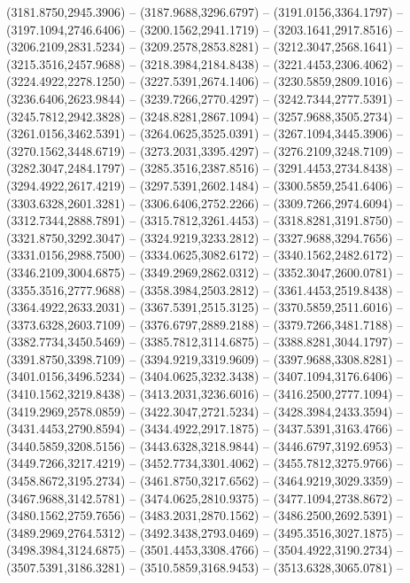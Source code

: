 \begin{scope}[y=0.80pt, x=0.80pt, yscale=-1.000000, xscale=1.000000, inner sep=0pt, outer sep=0pt]
    (3181.8750,2945.3906) -- (3187.9688,3296.6797) -- (3191.0156,3364.1797) --
    (3197.1094,2746.6406) -- (3200.1562,2941.1719) -- (3203.1641,2917.8516) --
    (3206.2109,2831.5234) -- (3209.2578,2853.8281) -- (3212.3047,2568.1641) --
    (3215.3516,2457.9688) -- (3218.3984,2184.8438) -- (3221.4453,2306.4062) --
    (3224.4922,2278.1250) -- (3227.5391,2674.1406) -- (3230.5859,2809.1016) --
    (3236.6406,2623.9844) -- (3239.7266,2770.4297) -- (3242.7344,2777.5391) --
    (3245.7812,2942.3828) -- (3248.8281,2867.1094) -- (3257.9688,3505.2734) --
    (3261.0156,3462.5391) -- (3264.0625,3525.0391) -- (3267.1094,3445.3906) --
    (3270.1562,3448.6719) -- (3273.2031,3395.4297) -- (3276.2109,3248.7109) --
    (3282.3047,2484.1797) -- (3285.3516,2387.8516) -- (3291.4453,2734.8438) --
    (3294.4922,2617.4219) -- (3297.5391,2602.1484) -- (3300.5859,2541.6406) --
    (3303.6328,2601.3281) -- (3306.6406,2752.2266) -- (3309.7266,2974.6094) --
    (3312.7344,2888.7891) -- (3315.7812,3261.4453) -- (3318.8281,3191.8750) --
    (3321.8750,3292.3047) -- (3324.9219,3233.2812) -- (3327.9688,3294.7656) --
    (3331.0156,2988.7500) -- (3334.0625,3082.6172) -- (3340.1562,2482.6172) --
    (3346.2109,3004.6875) -- (3349.2969,2862.0312) -- (3352.3047,2600.0781) --
    (3355.3516,2777.9688) -- (3358.3984,2503.2812) -- (3361.4453,2519.8438) --
    (3364.4922,2633.2031) -- (3367.5391,2515.3125) -- (3370.5859,2511.6016) --
    (3373.6328,2603.7109) -- (3376.6797,2889.2188) -- (3379.7266,3481.7188) --
    (3382.7734,3450.5469) -- (3385.7812,3114.6875) -- (3388.8281,3044.1797) --
    (3391.8750,3398.7109) -- (3394.9219,3319.9609) -- (3397.9688,3308.8281) --
    (3401.0156,3496.5234) -- (3404.0625,3232.3438) -- (3407.1094,3176.6406) --
    (3410.1562,3219.8438) -- (3413.2031,3236.6016) -- (3416.2500,2777.1094) --
    (3419.2969,2578.0859) -- (3422.3047,2721.5234) -- (3428.3984,2433.3594) --
    (3431.4453,2790.8594) -- (3434.4922,2917.1875) -- (3437.5391,3163.4766) --
    (3440.5859,3208.5156) -- (3443.6328,3218.9844) -- (3446.6797,3192.6953) --
    (3449.7266,3217.4219) -- (3452.7734,3301.4062) -- (3455.7812,3275.9766) --
    (3458.8672,3195.2734) -- (3461.8750,3217.6562) -- (3464.9219,3029.3359) --
    (3467.9688,3142.5781) -- (3474.0625,2810.9375) -- (3477.1094,2738.8672) --
    (3480.1562,2759.7656) -- (3483.2031,2870.1562) -- (3486.2500,2692.5391) --
    (3489.2969,2764.5312) -- (3492.3438,2793.0469) -- (3495.3516,3027.1875) --
    (3498.3984,3124.6875) -- (3501.4453,3308.4766) -- (3504.4922,3190.2734) --
    (3507.5391,3186.3281) -- (3510.5859,3168.9453) -- (3513.6328,3065.0781) --

\end{scope}
